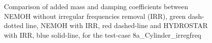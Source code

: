\documentclass[12pt,a4paper,titlepage]{article}
\begin{document}
\begin{figure}[ht!]
\centering
{}
\caption{Comparison of added mass and damping coefficients between NEMOH without irregular frequencies removal (IRR), green dash-dotted line, NEMOH with IRR, red dashed-line and HYDROSTAR with IRR, blue solid-line, for the test-case 8a\_Cylinder\_irregfreq}\label{fig:Cylinder_IRR_addedmass_dampcoef}
\end{figure}
\end{document}
